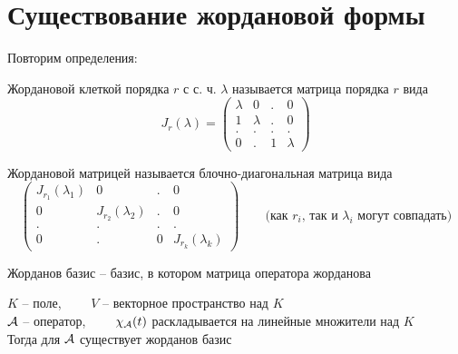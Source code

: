 \section{Существование жордановой формы}

Повторим определения:

\begin{definition}
	Жордановой клеткой порядка $ r $ с с. ч. $ \lambda $ называется матрица порядка $ r $ вида
	$$ J_r(\lambda) =
	\begin{pmatrix}
		\lambda & 0 & . & 0 \\
		1 & \lambda & . & 0 \\
		. & . & . & . \\
		0 & . & 1 & \lambda
	\end{pmatrix} $$
\end{definition}

\begin{definition}
	Жордановой матрицей называется блочно-диагональная матрица вида
	$$
	\begin{pmatrix}
		J_{r_1}(\lambda_1) & 0 & . & 0 \\
		0 & J_{r_2}(\lambda_2) & . & 0 \\
		. & . & . & . \\
		0 & . & 0 & J_{r_k}(\lambda_k)
	\end{pmatrix} \qquad \text{(как } r_i \text{, так и } \lambda_i \text{ могут совпадать)} $$
\end{definition}

\begin{definition}
	Жорданов базис -- базис, в котором матрица оператора жорданова
\end{definition}

\begin{theorem}
	$ K $ -- поле, $ \qquad V $ -- векторное пространство над $ K $ \\
	$ \mathcal{A} $ -- оператор, $ \qquad \chi_{\mathcal{A}}(t) $ раскладывается на линейные множители над $ K $ \\
	Тогда для $ \mathcal{A} $ существует жорданов базис
\end{theorem}
